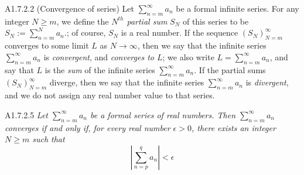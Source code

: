 \begin{definition}{A1.7.2.2}
    (Convergence of series) Let $\sum_{n=m}^{\infty} a_n$ be a formal infinite series.
    For any integer $N \geq m$, we define the \emph{$N^{th}$ partial sum} $S_N$ of
    this series to be $S_N := \sum_{n=m}^{N} a_n$.; of course, $S_N$ is a real number.
    If the sequence $(S_N)_{N=m}^{\infty}$ converges to some limit $L$ as $N \rightarrow \infty$,
    then we say that the infinite series $\sum_{n=m}^{\infty} a_n$ is \emph{convergent},
    and \emph{converges to $L$}; we also write $L = \sum_{n=m}^{\infty} a_n$, and
    say that $L$ is the \emph{sum} of  the infinite series $\sum_{n=m}^{\infty} a_n$.
    If the partial sums $(S_N)_{N=m}^{\infty}$ diverge, then we say that the infinite
    series $\sum_{n=m}^{\infty} a_n$ is \emph{divergent}, and we do not assign any
    real number value to that series.
\end{definition}

\begin{proposition}{A1.7.2.5}
    \emph{Let $\sum_{n=m}^{\infty} a_n$ be a formal series of real numbers. Then
    $\sum_{n=m}^{\infty} a_n$ converges if and only if, for every real number
    $\epsilon > 0$, there exists an integer $N \geq m$ such that
    \begin{equation*}
        |\sum_{n=p}^{q} a_n| < \epsilon
    \end{equation*}
    }
\end{proposition}

